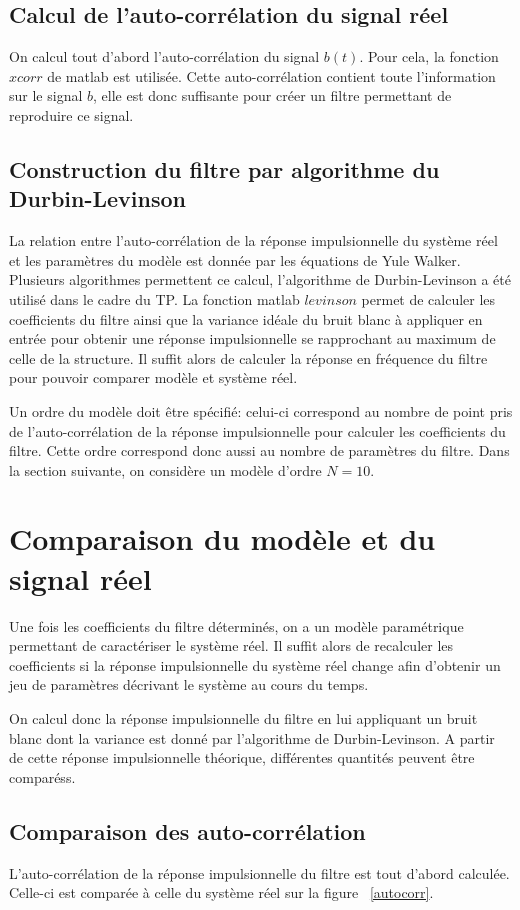 \documentclass[a4paper]{article}
\begin{document}
\subsection{Calcul de l'auto-corrélation du signal réel}
On calcul tout d'abord l'auto-corrélation du signal $b(t)$. Pour cela, la fonction $xcorr$ de matlab est utilisée. Cette auto-corrélation contient toute l'information sur le signal $b$, elle est donc suffisante pour créer un filtre permettant de reproduire ce signal.

\subsection{Construction du filtre par algorithme du Durbin-Levinson}
La relation entre l'auto-corrélation de la réponse impulsionnelle du système réel et les paramètres du modèle est donnée par les équations de Yule Walker. Plusieurs algorithmes permettent ce calcul, l'algorithme de Durbin-Levinson a été utilisé dans le cadre du TP. La fonction matlab $levinson$ permet de calculer les coefficients du filtre ainsi que la variance idéale du bruit blanc à appliquer en entrée pour obtenir une réponse impulsionnelle se rapprochant au maximum de celle de la structure. Il suffit alors de calculer la réponse en fréquence du filtre pour pouvoir comparer modèle et système réel.

\bigskip
Un ordre du modèle doit être spécifié: celui-ci correspond au nombre de point pris de l'auto-corrélation de la réponse impulsionnelle pour calculer les coefficients du filtre. Cette ordre correspond donc aussi au nombre de paramètres du filtre. Dans la section suivante, on considère un modèle d'ordre $N=10$.

\section{Comparaison du modèle et du signal réel}
Une fois les coefficients du filtre déterminés, on a un modèle paramétrique permettant de caractériser le système réel. Il suffit alors de recalculer les coefficients si la réponse impulsionnelle du système réel change afin d'obtenir un jeu de paramètres décrivant le système au cours du temps.

On calcul donc la réponse impulsionnelle du filtre en lui appliquant un bruit blanc dont la variance est donné par l'algorithme de Durbin-Levinson. A partir de cette réponse impulsionnelle théorique, différentes quantités peuvent être comparéss.

\subsection{Comparaison des auto-corrélation}
L'auto-corrélation de la réponse impulsionnelle du filtre est tout d'abord calculée. Celle-ci est comparée à celle du système réel sur la figure ~\ref{autocorr}.
\end{document}
